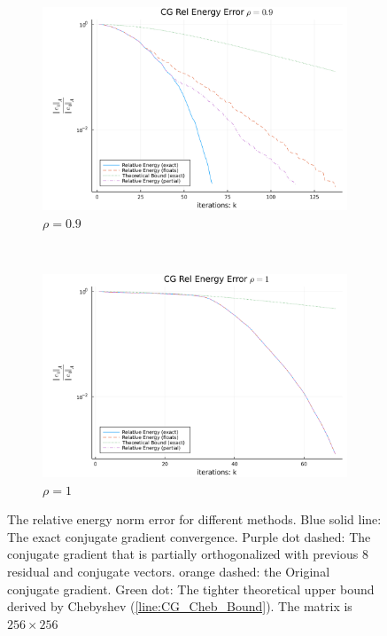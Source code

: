 \documentclass[]{article}
\theoremstyle{definition}
\begin{document}
        \begin{figure}[H]
            \centering
            \begin{subfigure}[H]{14cm}
                \centering
                \includegraphics[width=12cm]{cg_convergence_0.9.png}
                \caption{$\rho = 0.9$}
                \label{fig:1top}
            \end{subfigure}
            \\[2em]
            \begin{subfigure}[H]{14cm}
                \centering
                \includegraphics[width=12cm]{cg_convergence_1.png}
                \caption{$\rho = 1$}
                \label{fig:1bottom}
            \end{subfigure}
            \caption{
                The relative energy norm error for different methods. Blue solid line: The exact conjugate gradient convergence. Purple dot dashed: The conjugate gradient that is partially orthogonalized with previous 8 residual and conjugate vectors. orange dashed: the Original conjugate gradient. Green dot: The tighter theoretical upper bound derived by Chebyshev (\hyperref[line:CG_Cheb_Bound]{\ref*{line:CG_Cheb_Bound}}). The matrix is $256\times 256$
            }
            \label{fig:1}
        \end{figure}
\end{document}
